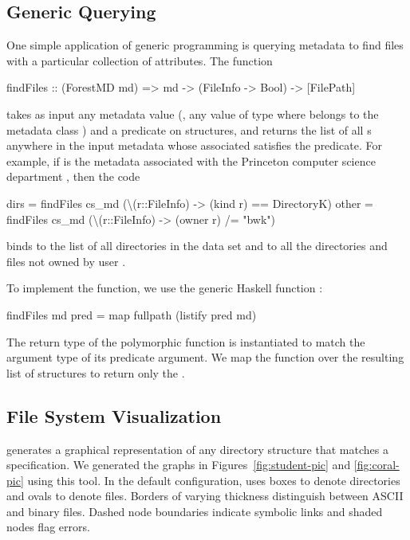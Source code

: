 \subsection{Generic Querying }
One simple application of generic programming is querying 
metadata to find files with a particular collection of attributes. 
The  function 
\begin{code}
findFiles :: (ForestMD md) => 
     md -> (FileInfo -> Bool) -> [FilePath]
\end{code}
takes as input any \forest{} metadata value (\ie{}, any
value of type  where  belongs to the \forest{}
metadata class ) and a predicate on 
structures, and returns the list of all s anywhere in the
input metadata whose associated  satisfies the
predicate.  For example, if  is the metadata associated
with the Princeton computer science department \filestore{}, then the code 
\begin{code}
dirs  = findFiles cs_md (\textbackslash(r::FileInfo) -> 
                           (kind r) == DirectoryK)
other = findFiles cs_md (\textbackslash(r::FileInfo) -> 
                           (owner r) /= "bwk")
\end{code}
binds  to the list of all directories in the data set and
 to all the directories and files not owned by 
user .

To implement the  function, we use the generic Haskell
function : 
\begin{code}
findFiles md pred = map fullpath (listify pred md)
\end{code}
The return type of the polymorphic  function is
instantiated to match the argument type of its predicate argument. 
We map the  function over the resulting list of
 structures to return only the .

\subsection{File System Visualization}
\fg{} generates a graphical representation of any directory structure
that matches a \forest{} specification.  We generated the graphs in 
Figures~\ref{fig:student-pic} and \ref{fig:coral-pic} using  
this tool.  In the default configuration, \fg{} uses boxes to denote
directories and ovals to denote files. Borders of varying
thickness distinguish between ASCII and binary files.  
Dashed node boundaries indicate symbolic links and shaded nodes flag errors.

